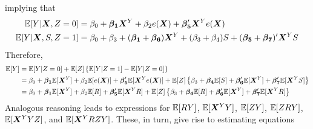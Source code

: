 \documentclass[11pt]{article} %
\begin{document}
implying that
\begin{equation*}
  \begin{split}
    \mathbb{E}[Y|\bm{X},Z=0]&=\beta_0+\bm{\beta_1}\bm{X}^Y+\beta_2e(\bm{X})+\bm{\beta_5}'\bm{X}^Ye(\bm{X})\\
    \mathbb{E}[Y|\bm{X},S,Z=1]&=\beta_0+\beta_3+(\bm{\beta_1}+\bm{\beta_6})\bm{X}^Y+(\beta_3+\beta_4)S+(\bm{\beta_5}+\bm{\beta_7})'\bm{X}^Y S
  \end{split}
\end{equation*}
Therefore,
\begin{align*}
  \mathbb{E}[Y]&=\mathbb{E}[Y|Z=0]+\mathbb{E}[Z]\left\{\mathbb{E}[Y|Z=1]-\mathbb{E}[Y|Z=0]\right\}\\
  &=\beta_0+\bm{\beta_1}\mathbb{E}[\bm{X}^Y]+\beta_2\mathbb{E}[e(\bm{X})]+\bm{\beta_5}'\mathbb{E}[\bm{X}^Ye(\bm{X})]+\mathbb{E}[Z]\left\{\beta_3+\bm{\beta_4}\mathbb{E}[S]+\bm{\beta_6}'\mathbb{E}[\bm{X}^Y]+\bm{\beta_7}'\mathbb{E}[\bm{X}^Y S]\right\}\\
  &=\beta_0+\bm{\beta_1}\mathbb{E}[\bm{X}^Y]+\beta_2\mathbb{E}[R]+\bm{\beta_5}'\mathbb{E}[\bm{X}^Y R]+\mathbb{E}[Z]\left\{\beta_3+\bm{\beta_4}\mathbb{E}[R]+\bm{\beta_6}'\mathbb{E}[\bm{X}^Y]+\bm{\beta_7}'\mathbb{E}[\bm{X}^Y R]\right\}\\
\end{align*}
Analogous reasoning leads to expressions for $\mathbb{E}[RY]$, $\mathbb{E}[\bm{X}^Y Y]$, $\mathbb{E}[ZY]$,  $\mathbb{E}[ZRY]$, $\mathbb{E}[\bm{X}^Y YZ]$, and $\mathbb{E}[\bm{X}^Y RZY]$.
These, in turn, give rise to estimating equations
\end{document}

